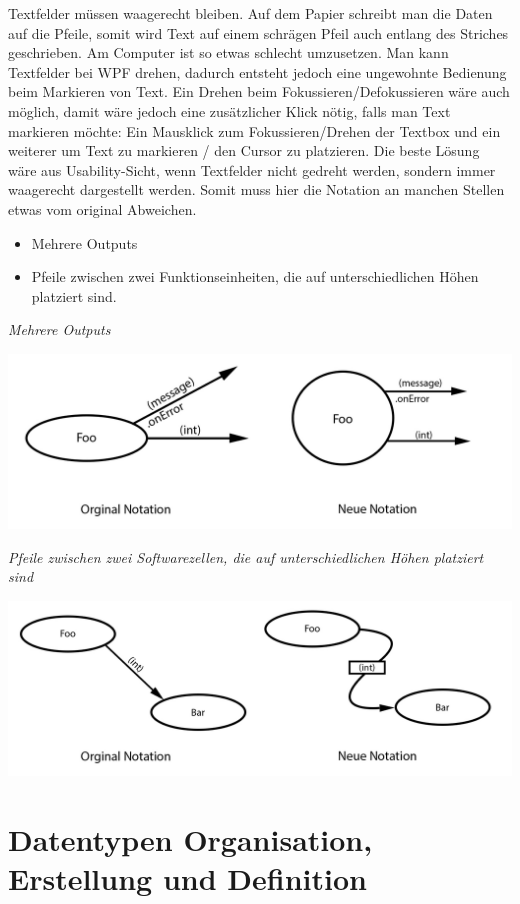 Textfelder müssen waagerecht bleiben. Auf dem Papier schreibt man die Daten auf
die Pfeile, somit wird Text auf einem schrägen Pfeil auch entlang des Striches
geschrieben.
Am Computer ist so etwas schlecht umzusetzen. Man kann Textfelder bei WPF drehen, dadurch
entsteht jedoch eine ungewohnte Bedienung beim Markieren von Text. Ein Drehen
beim Fokussieren/Defokussieren wäre auch möglich, damit wäre jedoch eine zusätzlicher
Klick nötig, falls man Text markieren möchte: Ein Mausklick zum Fokussieren/Drehen
der Textbox und ein weiterer um Text zu markieren / den Cursor zu platzieren.
Die beste Lösung wäre aus Usability-Sicht, wenn Textfelder nicht gedreht werden,
sondern immer waagerecht dargestellt werden. Somit muss hier die Notation an
manchen Stellen etwas vom original Abweichen.
\begin{itemize}
\item Mehrere Outputs
\item Pfeile zwischen zwei Funktionseinheiten, die auf unterschiedlichen Höhen platziert
sind.
\end{itemize}

\pagebreak
\emph{Mehrere Outputs}



\includegraphics[width=.9\linewidth]{./img/NotationChanges1.jpg}
\bigskip

\emph{
Pfeile zwischen zwei Softwarezellen, die auf unterschiedlichen Höhen platziert
sind}

\includegraphics[width=.9\linewidth]{./img/NotationChanges2.jpg}



\section{Datentypen Organisation, Erstellung und Definition}

